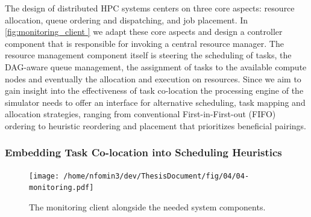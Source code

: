 The design of distributed HPC systems centers on three core aspects: resource allocation, queue ordering and dispatching, and job placement. In \ref{fig:monitoring_client } we adapt these core aspects and design a controller component that is responsible for invoking a central resource manager. The resource management component itself is steering the scheduling of tasks, the DAG-aware queue management, the assignment of tasks to the available compute nodes and eventually the allocation and execution on resources.
Since we aim to gain insight into the effectiveness of task co-location the processing engine of the simulator needs to offer an interface for alternative scheduling, task mapping and allocation strategies, ranging from conventional First-in-First-out (FIFO) ordering to heuristic reordering and placement that prioritizes beneficial pairings.

\subsubsection{Embedding Task Co-location into Scheduling Heuristics}
\label{sec:heuristic_design}

\begin{figure}[htbp]
    \centering
    \texttt{[image: /home/nfomin3/dev/ThesisDocument/fig/04/04-monitoring.pdf]} %
    \caption{The monitoring client alongside the needed system components.}
    \label{fig:monitoring_client}
\end{figure}

